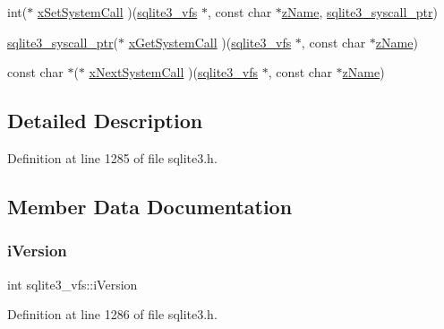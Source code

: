 \begin{DoxyCompactItemize}
int($\ast$ \mbox{\hyperlink{structsqlite3__vfs_a444cd80f79ea4994f72551bb9f403866}{x\+Set\+System\+Call}} )(\mbox{\hyperlink{structsqlite3__vfs}{sqlite3\+\_\+vfs}} $\ast$, const char $\ast$\mbox{\hyperlink{structsqlite3__vfs_a0f06a27ac2201ea04c0623ef19e5d73e}{z\+Name}}, \mbox{\hyperlink{sqlite3_8h_a99a6393e96d7095fa024de9c1257aa6f}{sqlite3\+\_\+syscall\+\_\+ptr}})
\item 
\mbox{\hyperlink{sqlite3_8h_a99a6393e96d7095fa024de9c1257aa6f}{sqlite3\+\_\+syscall\+\_\+ptr}}($\ast$ \mbox{\hyperlink{structsqlite3__vfs_a1bf78a1603ab605cd92d146e3f810727}{x\+Get\+System\+Call}} )(\mbox{\hyperlink{structsqlite3__vfs}{sqlite3\+\_\+vfs}} $\ast$, const char $\ast$\mbox{\hyperlink{structsqlite3__vfs_a0f06a27ac2201ea04c0623ef19e5d73e}{z\+Name}})
\item 
const char $\ast$($\ast$ \mbox{\hyperlink{structsqlite3__vfs_afbd158883d9bb7954fa7ecd595fe3c2b}{x\+Next\+System\+Call}} )(\mbox{\hyperlink{structsqlite3__vfs}{sqlite3\+\_\+vfs}} $\ast$, const char $\ast$\mbox{\hyperlink{structsqlite3__vfs_a0f06a27ac2201ea04c0623ef19e5d73e}{z\+Name}})
\end{DoxyCompactItemize}


\subsection{Detailed Description}


Definition at line 1285 of file sqlite3.\+h.



\subsection{Member Data Documentation}
\mbox{\label{structsqlite3__vfs_a694dd264949bd163545fe174510ed019}} 
\subsubsection{\texorpdfstring{i\+Version}{iVersion}}
{\footnotesize\ttfamily int sqlite3\+\_\+vfs\+::i\+Version}



Definition at line 1286 of file sqlite3.\+h.

\mbox{\label{structsqlite3__vfs_adb2d82c74891b00b5529fb94e7710135}} 
